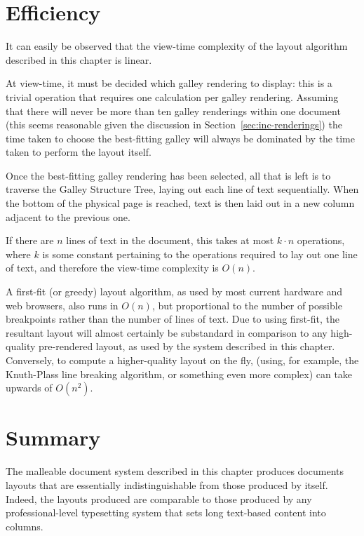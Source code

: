 \section{Efficiency}

It can easily be observed that the view-time complexity of the layout algorithm described in this chapter is linear.

At view-time, it must be decided which galley rendering to display: this is a trivial operation that requires one calculation per galley rendering. Assuming that there will never be more than ten galley renderings within one document (this seems reasonable given the discussion in Section~\ref{sec:inc-renderings}) the time taken to choose the best-fitting galley will always be dominated by the time taken to perform the layout itself.

Once the best-fitting galley rendering has been selected, all that is left is to traverse the Galley Structure Tree, laying out each line of text sequentially. When the bottom of the physical page is reached, text is then laid out in a new column adjacent to the previous one.

If there are $n$ lines of text in the document, this takes at most $k\cdot{}n$ operations, where $k$ is some constant pertaining to the operations required to lay out one line of text, and therefore the view-time complexity is $O(n)$.

A first-fit (or greedy) layout algorithm, as used by most current \ebook{} hardware and web browsers, also runs in $O(n)$, but proportional to the number of possible breakpoints rather than the number of lines of text. Due to using first-fit, the resultant layout will almost certainly be substandard in comparison to any high-quality pre-rendered layout, as used by the system described in this chapter. Conversely, to compute a higher-quality layout on the fly, (using, for example, the Knuth-Plass line breaking algorithm,\hspace{0pt}\cite{Knuth1981,Knuth1999} or something even more complex) can take upwards of $O(n^2)$.\hspace{0pt}\cite{Hirschberg1987,Eppstein1992,Hurst2009,Pinkney2013}

\section{Summary}
The malleable document system described in this chapter produces documents layouts that are essentially indistinguishable from those produced by \troff{} itself. Indeed, the layouts produced are comparable to those produced by any professional-level typesetting system that sets long text-based content into columns.


